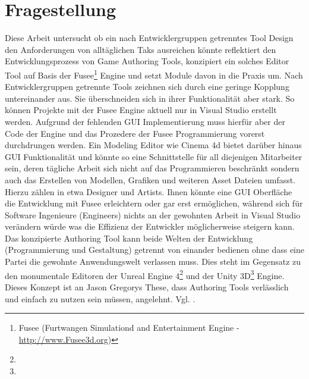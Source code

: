 \documentclass[pagesize, paper=a4, fontsize=12pt, titlepage=true, headings=small, headnosepline, abstractoff, liststotoc, nochapterprefix, plainheadsepline, twoside]{scrreprt}
\begin{document}
\section{Fragestellung}
Diese Arbeit untersucht ob ein nach Entwicklergruppen getrenntes Tool Design den Anforderungen von alltäglichen Taks ausreichen könnte reflektiert den Entwicklungsprozess von Game Authoring Tools, konzipiert ein solches Editor Tool auf Basis der Fusee\footnote{Fusee (Furtwangen Simulationd and Entertainment Engine - \url{http://www.Fusee3d.org})} Engine und setzt Module davon in die Praxis um. Nach Entwicklergruppen getrennte Tools zeichnen sich durch eine geringe Kopplung untereinander aus. Sie überschneiden sich in ihrer Funktionalität aber stark. So können Projekte mit der Fusee Engine aktuell nur in Visual Studio erstellt werden. Aufgrund der fehlenden GUI Implementierung muss hierfür aber der Code der Engine und das Prozedere der Fusee Programmierung vorerst durchdrungen werden. Ein Modeling Editor wie Cinema 4d bietet darüber hinaus GUI Funktionalität und könnte so eine Schnittstelle für all diejenigen Mitarbeiter sein, deren tägliche Arbeit sich nicht auf das Programmieren beschränkt sondern auch das Erstellen von Modellen, Grafiken und weiteren Asset Dateien umfasst. Hierzu zählen in etwa Designer und Artists. Ihnen könnte eine GUI Oberfläche die Entwicklung mit Fusee erleichtern oder gar erst ermöglichen, während sich für Software Ingenieure (Engineers) nichts an der gewohnten Arbeit in Visual Studio verändern würde was die Effizienz der Entwickler möglicherweise steigern kann. Das konzipierte Authoring Tool kann beide Welten der Entwicklung (Programmierung und Gestaltung) getrennt von einander bedienen ohne dass eine Partei die gewohnte Anwendungswelt verlassen muss. Dies steht im Gegensatz zu den monumentale Editoren der Unreal Engine 4\footnote{} und der Unity 3D\footnote{} Engine. 
Dieses Konzept ist an Jason Gregorys These, dass Authoring Tools verlässlich und einfach zu nutzen sein müssen, angelehnt. Vgl. .
\end{document}
